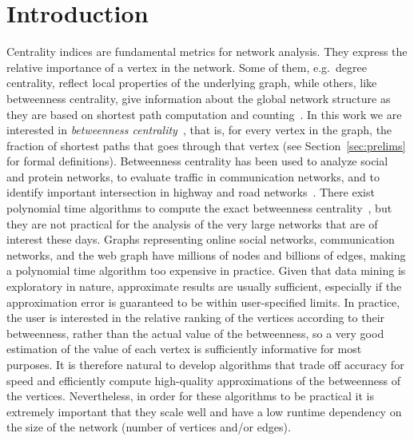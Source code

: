 \section{Introduction}\label{sec:intro}
Centrality indices are fundamental metrics for network analysis. They express the
relative importance of a vertex in the network. Some of them, e.g.~degree
centrality, reflect local properties of the underlying graph, while others,
like betweenness centrality, give information about the global network structure
as they are based on shortest path computation and counting~\citep{Newman10}. In
this work we are interested in \emph{betweenness
centrality}~\citep{Anthonisse71,Freeman77}, that is, for every vertex in the
graph, the fraction of shortest paths that goes through that vertex (see
Section~\ref{sec:prelims} for formal definitions). Betweenness centrality has
been used to analyze social and protein networks, to evaluate traffic in
communication networks, and to identify important intersection in highway and
road networks~\citep{Newman10,GeisbergerSS08}. There exist polynomial time
algorithms to compute the exact betweenness centrality~\citep{Brandes01}, but
they are not practical for the analysis of the very large networks that are of
interest these days. Graphs representing online social networks, communication
networks, and the web graph have millions of nodes and billions of edges,
making a polynomial time algorithm too expensive in practice. Given that data
mining is exploratory in nature, approximate results are usually sufficient,
especially if the approximation error is guaranteed to be within user-specified
limits. In practice, the user is interested in the relative ranking of the
vertices according to their betweenness, rather than the actual value of the
betweenness, so a very good estimation of the value of each vertex is
sufficiently informative for most purposes. It is therefore natural to develop
algorithms that trade off accuracy for speed and efficiently compute
high-quality approximations of the betweenness of the vertices.  Nevertheless,
in order for these algorithms to be practical it is extremely important that
they scale well and have a low runtime dependency on the size of the network
(number of vertices and/or edges).

